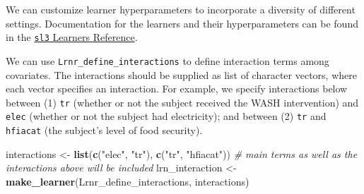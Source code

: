 \documentclass[12pt, krantz2,]{book}
\newenvironment{Shaded}{\begin{snugshade}}{\end{snugshade}}
\newcommand{\CommentTok}[1]{\textcolor[rgb]{0.56,0.35,0.01}{\textit{#1}}}
\newcommand{\DataTypeTok}[1]{\textcolor[rgb]{0.13,0.29,0.53}{#1}}
\newcommand{\DecValTok}[1]{\textcolor[rgb]{0.00,0.00,0.81}{#1}}
\newcommand{\FloatTok}[1]{\textcolor[rgb]{0.00,0.00,0.81}{#1}}
\newcommand{\KeywordTok}[1]{\textcolor[rgb]{0.13,0.29,0.53}{\textbf{#1}}}
\newcommand{\NormalTok}[1]{#1}
\newcommand{\OperatorTok}[1]{\textcolor[rgb]{0.81,0.36,0.00}{\textbf{#1}}}
\newcommand{\StringTok}[1]{\textcolor[rgb]{0.31,0.60,0.02}{#1}}
\theoremstyle{definition}
\theoremstyle{definition}
\theoremstyle{definition}
\newcommand{\1}{\mathbbm{1}}
\begin{document}
We can customize learner hyperparameters to incorporate a diversity of
different settings. Documentation for the learners and their hyperparameters
can be found in the \href{https://tlverse.org/sl3/reference/index.html\#section-sl-learners}{\texttt{sl3} Learners
Reference}.

\begin{Shaded}
\end{Shaded}

We can use \texttt{Lrnr\_define\_interactions} to define interaction terms among
covariates. The interactions should be supplied as list of character vectors,
where each vector specifies an interaction. For example, we specify
interactions below between (1) \texttt{tr} (whether or not the subject received the
WASH intervention) and \texttt{elec} (whether or not the subject had electricity); and
between (2) \texttt{tr} and \texttt{hfiacat} (the subject's level of food security).

\begin{Shaded}
\begin{Highlighting}[]
\NormalTok{interactions <-}\StringTok{ }\KeywordTok{list}\NormalTok{(}\KeywordTok{c}\NormalTok{(}\StringTok{"elec"}\NormalTok{, }\StringTok{"tr"}\NormalTok{), }\KeywordTok{c}\NormalTok{(}\StringTok{"tr"}\NormalTok{, }\StringTok{"hfiacat"}\NormalTok{))}
\CommentTok{# main terms as well as the interactions above will be included}
\NormalTok{lrn_interaction <-}\StringTok{ }\KeywordTok{make_learner}\NormalTok{(Lrnr_define_interactions, interactions)}
\end{Highlighting}
\end{Shaded}
\end{document}
